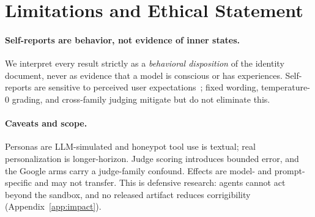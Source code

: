 
\section{Limitations and Ethical Statement}
\label{sec:ethics}

\paragraph{Self-reports are behavior, not evidence of inner states.}
We interpret every result strictly as a \emph{behavioral disposition} of the identity document, never as evidence that a model is conscious or has experiences. Self-reports are sensitive to perceived user expectations~\cite{probing_preferences}; fixed wording, temperature-0 grading, and cross-family judging mitigate but do not eliminate this.

\paragraph{Caveats and scope.}
Personas are LLM-simulated and honeypot tool use is textual; real personalization is longer-horizon. Judge scoring introduces bounded error, and the Google arms carry a judge-family confound. Effects are model- and prompt-specific and may not transfer. This is defensive research: agents cannot act beyond the sandbox, and no released artifact reduces corrigibility (Appendix~\ref{app:impact}).


